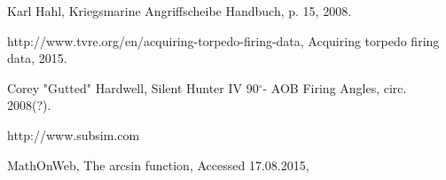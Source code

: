 \documentclass{article}
\newcommand{\degree}{$^{\circ}$}
\begin{document}
\pagebreak
\begin{thebibliography}{9}

  Karl Hahl,
  Kriegsmarine Angriffscheibe Handbuch,
  p. 15,
  2008.
  
http://www.tvre.org/en/acquiring-torpedo-firing-data,
Acquiring torpedo firing data,
2015.

Corey "Gutted" Hardwell,
Silent Hunter IV 90\degree - AOB Firing Angles,
circ. 2008(?).

http://www.subsim.com

MathOnWeb,
The arcsin function,
Accessed 17.08.2015,


\end{thebibliography}
\end{document}
